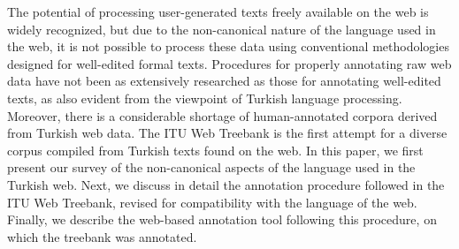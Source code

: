 The potential of processing user-generated texts freely available on the web is widely recognized, but due to the non-canonical nature of the language used in the web, it is not possible to process these data using conventional methodologies designed for well-edited formal texts. Procedures for properly annotating raw web data have not been as extensively researched as those for annotating well-edited texts, as also evident from the viewpoint of Turkish language processing. Moreover, there is a considerable shortage of human-annotated corpora derived from Turkish web data. The ITU Web Treebank is the first attempt for a diverse corpus compiled from Turkish texts found on the web. In this paper, we first present our survey of the non-canonical aspects of the language used in the Turkish web. Next, we discuss in detail the annotation procedure followed in the ITU Web Treebank, revised for compatibility with the language of the web. Finally, we describe the web-based annotation tool following this procedure, on which the treebank was annotated.

